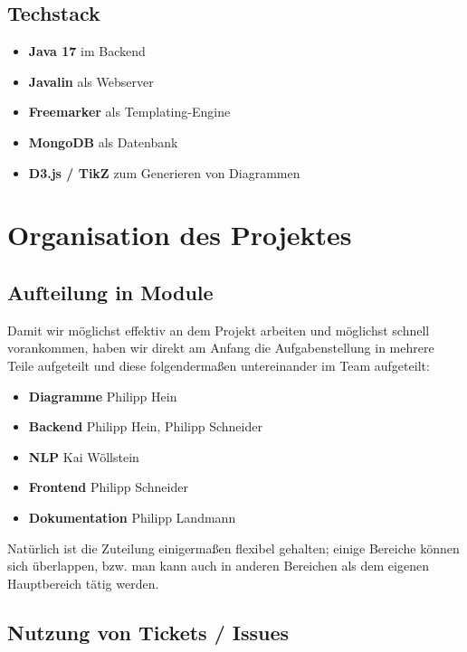 \documentclass[ngerman]{article}
\begin{document}
    \newpage
    \subsection{Techstack}

    \begin{itemize}
        \item \textbf{Java 17} im Backend
        \item \textbf{Javalin} als Webserver
        \item \textbf{Freemarker} als Templating-Engine
        \item \textbf{MongoDB} als Datenbank
        \item \textbf{D3.js / TikZ} zum Generieren von Diagrammen
    \end{itemize}

    \section{Organisation des Projektes}

    \subsection{Aufteilung in Module}

    Damit wir möglichst effektiv an dem Projekt arbeiten und möglichst schnell vorankommen, haben wir direkt am Anfang die Aufgabenstellung in mehrere Teile aufgeteilt und diese folgendermaßen untereinander im Team aufgeteilt:

    \begin{itemize}
        \item \textbf{Diagramme} Philipp Hein
        \item \textbf{Backend} Philipp Hein, Philipp Schneider
        \item \textbf{NLP} Kai Wöllstein
        \item \textbf{Frontend} Philipp Schneider
        \item \textbf{Dokumentation} Philipp Landmann
    \end{itemize}

    Natürlich ist die Zuteilung einigermaßen flexibel gehalten; einige Bereiche können sich überlappen, bzw. man kann auch in anderen Bereichen als dem eigenen Hauptbereich tätig werden.

    \subsection{Nutzung von Tickets / Issues}
\end{document}
